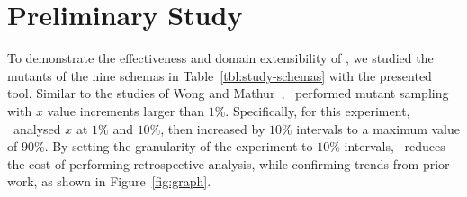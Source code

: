\section{Preliminary Study}

To demonstrate the effectiveness and domain extensibility of \mrstudyr, we studied the mutants of the nine schemas in
Table~\ref{tbl:study-schemas} with the presented tool. Similar to the studies of Wong and
Mathur~\cite{mathur1994empirical}, \mr~performed mutant sampling with $x$ value increments larger than $1\%$.
Specifically, for this experiment, \mr~analysed $x$ at $1\%$ and $10\%$, then increased by $10\%$ intervals to a maximum
value of $90\%$. By setting the granularity of the experiment to $10\%$ intervals, \mr~reduces the cost of performing
retrospective analysis, while confirming trends from prior work, as shown in Figure~\ref{fig:graph}.








